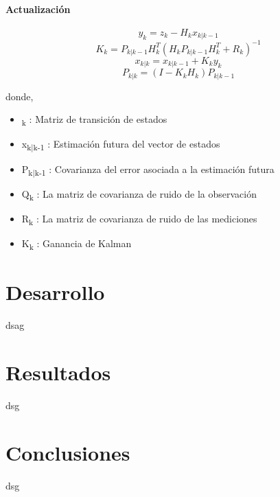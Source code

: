 \documentclass[10pt]{article}
\begin{document}
\paragraph{Actualización}
\begin{center}
\begin{equation}
y_k = z_k - H_k x_{k|k-1}
\end{equation}
\begin{equation}
K_k = P_{k|k-1} H_k ^ T (H_k P_{k|k-1} H_k ^ T + R_k)^{-1}
\end{equation}
\begin{equation}
x_{k|k} = x_{k|k-1} + K_k y_k
\end{equation}
\begin{equation}
P_{k|k} = (I - K_k H_k)P_{k|k-1}
\end{equation}
\end{center}
donde,
\begin{itemize}
\item \textPhi\textsubscript{k} : Matriz de transición de estados
\item x\textsubscript{k|k-1} : Estimación futura del vector de estados
\item P\textsubscript{k|k-1} : Covarianza del error asociada a la estimación futura
\item Q\textsubscript{k} : La matriz de covarianza de ruido de la observación
\item R\textsubscript{k} : La matriz de covarianza de ruido de las mediciones
\item K\textsubscript{k} : Ganancia de Kalman
\end{itemize}
\section{Desarrollo}
dsag
\section{Resultados}
dsg
\section{Conclusiones}
dsg
\end{document}
